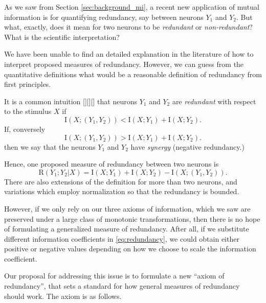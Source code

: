 \documentclass[12pt]{article}
\begin{document}
As we saw from Section \ref{sec:background_mi}, a recent new
application of mutual information is for quantifying redundancy, say
between neurons $Y_1$ and $Y_2$.  But what, exactly, does it mean for
two neurons to be \emph{redundant} or \emph{non-redundant}?  What is
the scientific interpretation?

We have been unable to find an detailed explanation in the literature
of how to interpret proposed measures of redundancy.  However, we can
guess from the quantitative definitions what would be a reasonable
definition of redundancy from first principles.

It is a common intuition [][][] that neurons $Y_1$ and $Y_2$
are \emph{redundant} with respect to the stimulus $X$ if
\[
\text{I}(X; (Y_1, Y_2)) < \text{I}(X; Y_1) + \text{I}(X; Y_2).
\]
If, conversely
\[
\text{I}(X; (Y_1, Y_2)) > \text{I}(X; Y_1) + \text{I}(X; Y_2).
\]
then we say that the neurons $Y_1$ and $Y_2$ have \emph{synergy}
(negative redundancy.)

Hence, one proposed measure of redundancy between two neurons is
\begin{equation}\label{eq:redundancy}
\text{R}(Y_1;Y_2|X) = \text{I}(X; Y_1) + \text{I}(X; Y_2) - \text{I}(X; (Y_1, Y_2)).
\end{equation}
There are also extensions of the definition for more than two neurons,
and variations which employ normalization so that the redundancy is
bounded.

However, if we only rely on our three axioms of information, which we
saw are preserved under a large class of monotonic transformations,
then there is no hope of formulating a generalized measure of
redundancy.  After all, if we substitute different information
coefficients in \ref{eq:redundancy}, we could obtain either positive
or negative values depending on how we choose to scale the information
coefficient.

Our proposal for addressing this issue is to formulate a new ``axiom
of redundancy'', that sets a standard for how general measures of
redundancy should work.  The axiom is as follows.
\end{document}
